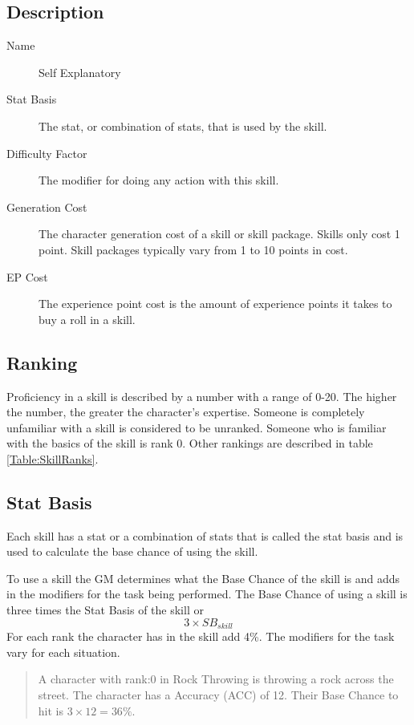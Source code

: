\subsection{Description}

\begin{description}
	\item[Name] 
	Self Explanatory
	\item[Stat Basis] 
	The stat, or combination of stats, that is used by the skill. 
	\item[Difficulty Factor] 
	The modifier for doing any action with this skill.
	\item[Generation Cost]
	The character generation cost of a skill or skill package. Skills
	only cost 1 point. Skill packages typically vary from 1
	to 10 points in cost.
	\item[EP Cost] 
	The experience point cost is the amount of experience points it takes to
	buy a roll in a skill. 
\end{description}

\subsection{Ranking}

Proficiency in a skill is described by a number with a range of 0-20.
The higher the number, the greater the character's expertise. Someone
is completely unfamiliar with a skill is considered to be
{unranked}. Someone who is familiar with the basics of
the skill is rank 0. Other rankings are described in table
\ref{Table:SkillRanks}.



\subsection{Stat Basis}

Each skill has a stat or a combination of stats that is called the 
stat basis and is used to calculate the base chance of using the 
skill. 

To use a skill the GM determines what the Base Chance of the skill is 
and adds in the modifiers for the task being performed.
The Base Chance of using a skill is three times the Stat Basis of the skill
or \[ 3 \times SB_{skill} \] For each rank the character has in the skill add 4\%.
The modifiers for the task vary for each situation.

\begin{quote}
A character with rank:0 in Rock Throwing is throwing a rock 
across the street. The character has a Accuracy (ACC) of 12. Their Base Chance 
to hit is \( 3 \times 12 = 36\% \).
\end{quote}

